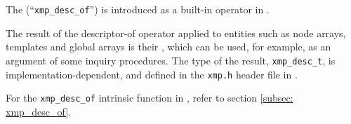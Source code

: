 The  (``{\tt xmp\_desc\_of}'') is
introduced as a built-in operator in {\XMPC}.

The result of the descriptor-of operator applied to {\XMP} entities such
as node arrays, templates and global arrays is their {\it
{}}, which can be used, for example, as an argument of
some inquiry procedures. The type of the result, {\tt xmp\_desc\_t}, is
implementation-dependent, and defined in the {\tt xmp.h} header file in
{\XMPC}.

For the {\tt xmp\_desc\_of} intrinsic function in {\XMPF}, refer to
section \ref{subsec: xmp_desc_of}.

